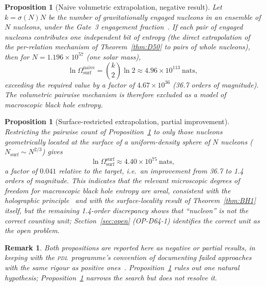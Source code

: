 \documentclass[12pt,a4paper]{article}
\newtheorem{proposition}[theorem]{Proposition}
\newtheorem{remark}[theorem]{Remark}
\newcommand{\PDL}{\textsc{pdl}}
\newcommand{\Omegasurf}{\Omega_{\mathrm{surf}}}
\begin{document}
\begin{proposition}[Naive volumetric extrapolation, negative result]
\label{prop:negative1}
Let $k = \sigma(N)N$ be the number of gravitationally engaged nucleons in an ensemble of $N$ nucleons, under the Gate~3 engagement fraction~\cite{PDL_D36_2026}. If each pair of engaged nucleons contributes one independent bit of entropy (the direct extrapolation of the per-relation mechanism of Theorem~\ref{thm:D50} to pairs of whole nucleons), then for $N=1.196\times10^{57}$ (one solar mass),
\begin{equation}
\ln\Omegasurf^{\mathrm{naive}} = \binom{k}{2}\ln 2 \approx 4.96\times10^{113}~\mathrm{nats},
\end{equation}
exceeding the required value by a factor of $4.67\times10^{36}$ (36.7 orders of magnitude). The volumetric pairwise mechanism is therefore excluded as a model of macroscopic black hole entropy.
\end{proposition}

\begin{proposition}[Surface-restricted extrapolation, partial improvement]
\label{prop:negative2}
Restricting the pairwise count of Proposition~\ref{prop:negative1} to only those nucleons geometrically located at the surface of a uniform-density sphere of $N$ nucleons ($N_{\mathrm{surf}} \sim N^{2/3}$) gives
\begin{equation}
\ln\Omegasurf^{\mathrm{surf}} \approx 4.40\times10^{75}~\mathrm{nats},
\end{equation}
a factor of $0.041$ relative to the target, i.e.\ an improvement from 36.7 to 1.4 orders of magnitude. This indicates that the relevant microscopic degrees of freedom for macroscopic black hole entropy are areal, consistent with the holographic principle~\cite{Hooft1993,Susskind1995} and with the surface-locality result of Theorem~\ref{thm:BH1} itself, but the remaining 1.4-order discrepancy shows that ``nucleon'' is not the correct counting unit; Section~\ref{sec:open} (OP-D64-1) identifies the correct unit as the open problem.
\end{proposition}

\begin{remark}
Both propositions are reported here as negative or partial results, in keeping with the \PDL\ programme's convention of documenting failed approaches with the same rigour as positive ones~\cite{PDL_DM_v29}. Proposition~\ref{prop:negative1} rules out one natural hypothesis; Proposition~\ref{prop:negative2} narrows the search but does not resolve it.
\end{remark}
\end{document}
